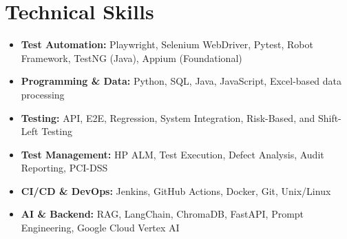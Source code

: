 \documentclass[a4paper,9.5pt]{article}
\begin{document}
\section{Technical Skills}
\begin{itemize}\small
\item \textbf{Test Automation:} Playwright, Selenium WebDriver, Pytest, Robot Framework, TestNG (Java), Appium (Foundational)
\item \textbf{Programming \& Data:} Python, SQL, Java, JavaScript, Excel-based data processing
\item \textbf{Testing:} API, E2E, Regression, System Integration, Risk-Based, and Shift-Left Testing
\item \textbf{Test Management:} HP ALM, Test Execution, Defect Analysis, Audit Reporting, PCI-DSS
\item \textbf{CI/CD \& DevOps:} Jenkins, GitHub Actions, Docker, Git, Unix/Linux
\item \textbf{AI \& Backend:} RAG, LangChain, ChromaDB, FastAPI, Prompt Engineering, Google Cloud Vertex AI
\end{itemize}
\end{document}
